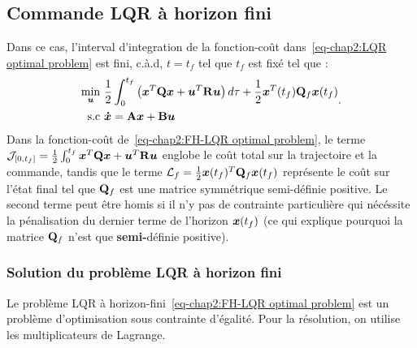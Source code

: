 \subsection{Commande LQR à horizon fini}
Dans ce cas, l'interval d'integration de la fonction-coût dans~\eqref{eq-chap2:LQR optimal problem} est fini, c.à.d, $t=t_f$ tel que $t_f$ est fixé tel que : 
\begin{align}\label{eq-chap2:FH-LQR optimal problem}
	\begin{split}
		\underset{\bm{u}}{\min}~&\frac{1}{2}\int_0^{t_f}\left(\bm{x}^T\mathbf{Q}\bm{x} + \bm{u}^T\mathbf{R}\bm{u}\right) d\tau + \frac{1}{2}\bm{x}^T(t_f)\mathbf{Q}_f\bm{x}(t_f)\\
		{\rm s.c}~&\bm{\dot{x}} = \mathbf{A}\bm{x}+\mathbf{B}\bm{u}
	\end{split}.
\end{align}
Dans la fonction-coût de~\eqref{eq-chap2:FH-LQR optimal problem}, le terme ${\cal J}_{\left[0,t_f	\right]}=\frac{1}{2}\int_0^{t_f}\bm{x}^T\mathbf{Q}\bm{x} + \bm{u}^T\mathbf{R}\bm{u}$ englobe le coût total sur la trajectoire et la commande, tandis que le terme ${\cal L}_f=\frac{1}{2}\bm{x}(t_f)^T\mathbf{Q}_f\bm{x}(t_f)$ représente le coût sur l'état final tel que $\mathbf{Q}_f$ est une matrice symmétrique semi-définie positive. Le second terme peut être homis si il n'y pas de contrainte particulière qui nécéssite la pénalisation du dernier terme de l'horizon $\bm{x}(t_f)$ (ce qui explique pourquoi la matrice $\mathbf{Q}_f$ n'est que \textbf{semi-}définie positive).

\subsubsection{Solution du problème LQR à horizon fini}\label{subsubsec-chap2:solution FT-LQR}
Le problème LQR à horizon-fini~\eqref{eq-chap2:FH-LQR optimal problem} est un problème d'optimisation sous contrainte d'égalité. Pour la résolution, on utilise les multiplicateurs de Lagrange.  

